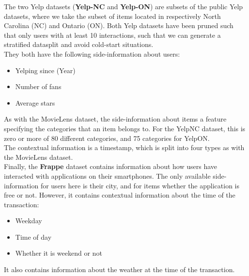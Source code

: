 The two Yelp datasets (\textbf{Yelp-NC} and \textbf{Yelp-ON}) are subsets of the public Yelp datasets, where we take the subset of items located in respectively North Carolina (NC) and Ontario (ON).
Both Yelp datasets have been pruned such that only users with at least 10 interactions, such that we can generate a stratified datasplit and avoid cold-start situations.\\
They both have the following side-information about users:
\begin{itemize}
    \item Yelping since (Year)
    \item Number of fans
    \item Average stars 
\end{itemize}
As with the MovieLens dataset, the side-information about items a feature specifying the categories that an item belongs to.
For the YelpNC dataset, this is zero or more of 80 different categories, and 75 categories for YelpON.\\
The contextual information is a timestamp, which is split into four types as with the MovieLens dataset.\\
Finally, the \textbf{Frappe} dataset contains information about how users have interacted with applications on their smartphones.
The only available side-information for users here is their city, and for items whether the application is free or not.
However, it contains contextual information about the time of the transaction:
\begin{itemize}
    \item Weekday
    \item Time of day
    \item Whether it is weekend or not
\end{itemize}
It also contains information about the weather at the time of the transaction.

